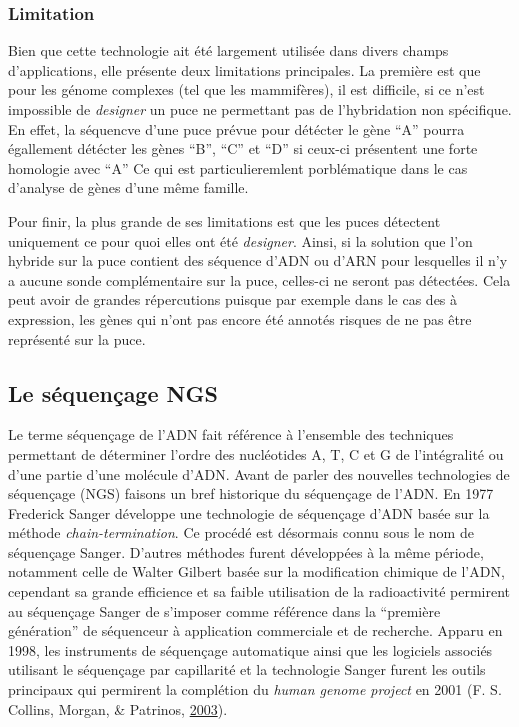 \documentclass[12pt,twoside]{reedthesis}
\theoremstyle{definition}
\theoremstyle{definition}
\theoremstyle{remark}
\begin{document}
  \subsubsection{Limitation}\label{limitation}
  
  Bien que cette technologie ait été largement utilisée dans divers champs
  d'applications, elle présente deux limitations principales. La première
  est que pour les génome complexes (tel que les mammifères), il est
  difficile, si ce n'est impossible de \emph{designer} un puce ne
  permettant pas de l'hybridation non spécifique. En effet, la séquencve
  d'une puce prévue pour détécter le gène ``A'' pourra égallement détécter
  les gènes ``B'', ``C'' et ``D'' si ceux-ci présentent une forte
  homologie avec ``A'' Ce qui est particulieremlent porblématique dans le
  cas d'analyse de gènes d'une même famille.
  
  Pour finir, la plus grande de ses limitations est que les puces
  détectent uniquement ce pour quoi elles ont été \emph{designer}. Ainsi,
  si la solution que l'on hybride sur la puce contient des séquence d'ADN
  ou d'ARN pour lesquelles il n'y a aucune sonde complémentaire sur la
  puce, celles-ci ne seront pas détectées. Cela peut avoir de grandes
  répercutions puisque par exemple dans le cas des à expression, les gènes
  qui n'ont pas encore été annotés risques de ne pas être représenté sur
  la puce.
  
  \newpage
  
  \hypertarget{ngs}{\subsection{Le séquençage NGS}\label{ngs}}
  
  Le terme séquençage de l'ADN fait référence à l'ensemble des techniques
  permettant de déterminer l'ordre des nucléotides A, T, C et G de
  l'intégralité ou d'une partie d'une molécule d'ADN. Avant de parler des
  nouvelles technologies de séquençage (NGS) faisons un bref historique du
  séquençage de l'ADN. En 1977 Frederick Sanger développe une technologie
  de séquençage d'ADN basée sur la méthode \emph{chain-termination}. Ce
  procédé est désormais connu sous le nom de séquençage Sanger. D'autres
  méthodes furent développées à la même période, notamment celle de Walter
  Gilbert basée sur la modification chimique de l'ADN, cependant sa grande
  efficience et sa faible utilisation de la radioactivité permirent au
  séquençage Sanger de s'imposer comme référence dans la ``première
  génération'' de séquenceur à application commerciale et de recherche.
  Apparu en 1998, les instruments de séquençage automatique ainsi que les
  logiciels associés utilisant le séquençage par capillarité et la
  technologie Sanger furent les outils principaux qui permirent la
  complétion du \emph{human genome project} en 2001 (F. S. Collins,
  Morgan, \& Patrinos, \protect\hyperlink{ref-Collins2003}{2003}).
  
\end{document}

